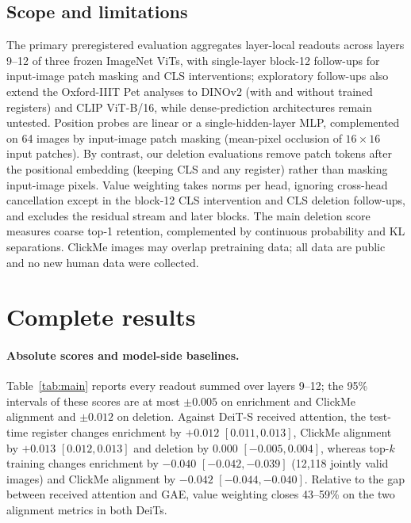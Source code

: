 \subsection{Scope and limitations}
\label{app:limitations}
The primary preregistered evaluation aggregates layer-local readouts across layers 9--12 of three frozen ImageNet ViTs, with single-layer block-12 follow-ups for input-image patch masking and CLS interventions; exploratory follow-ups also extend the Oxford-IIIT Pet analyses to DINOv2 (with and without trained registers) and CLIP ViT-B/16, while dense-prediction architectures remain untested. Position probes are linear or a single-hidden-layer MLP, complemented on 64 images by input-image patch masking (mean-pixel occlusion of $16{\times}16$ input patches). By contrast, our deletion evaluations remove patch tokens after the positional embedding (keeping CLS and any register) rather than masking input-image pixels. Value weighting takes norms per head, ignoring cross-head cancellation except in the block-12 CLS intervention and CLS deletion follow-ups, and excludes the residual stream and later blocks. The main deletion score measures coarse top-1 retention, complemented by continuous probability and KL separations. ClickMe images may overlap pretraining data; all data are public and no new human data were collected.

\section{Complete results}
\label{app:more}

\paragraph{Absolute scores and model-side baselines.} Table~\ref{tab:main} reports every readout summed over layers 9--12; the 95\% intervals of these scores are at most $\pm0.005$ on enrichment and ClickMe alignment and $\pm0.012$ on deletion. Against DeiT-S received attention, the test-time register changes enrichment by $+0.012$ $[0.011, 0.013]$, ClickMe alignment by $+0.013$ $[0.012, 0.013]$ and deletion by $0.000$ $[-0.005, 0.004]$, whereas top-$k$ training changes enrichment by $-0.040$ $[-0.042, -0.039]$ (12,118 jointly valid images) and ClickMe alignment by $-0.042$ $[-0.044, -0.040]$. Relative to the gap between received attention and GAE, value weighting closes 43--59\% on the two alignment metrics in both DeiTs.

